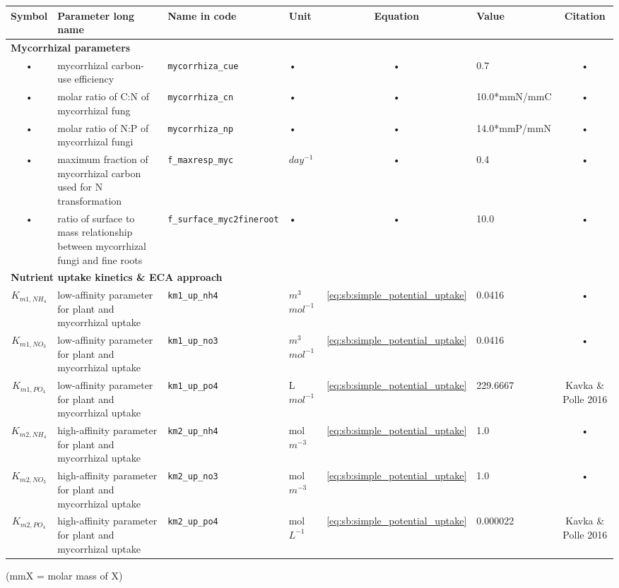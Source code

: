 \begin{table}
\begin{tabularx}{\linewidth}{|c|X|l|l|c|l|c|} %
\hline 
Symbol & Parameter long name & Name in code & Unit & Equation & Value & Citation \\ 
\hline 

\multicolumn{6}{l}{\bf Mycorrhizal parameters}\\
\hline
• & mycorrhizal carbon-use efficiency & \texttt{mycorrhiza\_cue} & • & • & 0.7 & • \\
• & molar ratio of C:N of mycorrhizal fung & \texttt{mycorrhiza\_cn} & • & • & 10.0*mmN/mmC & • \\
• & molar ratio of N:P of mycorrhizal fungi & \texttt{mycorrhiza\_np} & • & • & 14.0*mmP/mmN & • \\
• & maximum fraction of mycorrhizal carbon used for N transformation & \texttt{f\_maxresp\_myc} & $day^{-1}$ & • & 0.4 & • \\
• & ratio of surface to mass relationship between mycorrhizal fungi and fine roots & \texttt{f\_surface\_myc2fineroot} & • & • & 10.0 & • \\
\hline 

\multicolumn{6}{l}{\bf Nutrient uptake kinetics \& ECA approach}\\
\hline
$K_{m1,NH_4}$ & low-affinity parameter for plant and mycorrhizal uptake & \texttt{km1\_up\_nh4} & $m^3$ $mol^{-1}$ & \ref{eq:sb:simple_potential_uptake} & 0.0416 & • \\
$K_{m1,NO_3}$ & low-affinity parameter for plant and mycorrhizal uptake & \texttt{km1\_up\_no3} & $m^3$ $mol^{-1}$ & \ref{eq:sb:simple_potential_uptake} & 0.0416 & • \\
$K_{m1,PO_4}$ & low-affinity parameter for plant and mycorrhizal uptake & \texttt{km1\_up\_po4} & L $mol^{-1}$ & \ref{eq:sb:simple_potential_uptake} & 229.6667 & Kavka \& Polle 2016 \\
$K_{m2,NH_4}$ & high-affinity parameter for plant and mycorrhizal uptake & \texttt{km2\_up\_nh4} & mol $m^{-3}$ & \ref{eq:sb:simple_potential_uptake} & 1.0 & • \\
$K_{m2,NO_3}$ & high-affinity parameter for plant and mycorrhizal uptake & \texttt{km2\_up\_no3} & mol $m^{-3}$ & \ref{eq:sb:simple_potential_uptake} & 1.0 & • \\
$K_{m2,PO_4}$ & high-affinity parameter for plant and mycorrhizal uptake & \texttt{km2\_up\_po4} & mol $L^{-1}$ & \ref{eq:sb:simple_potential_uptake} & 0.000022 & Kavka \& Polle 2016 \\
\hline 
\end{tabularx}
(mmX = molar mass of X)
\end{table}



